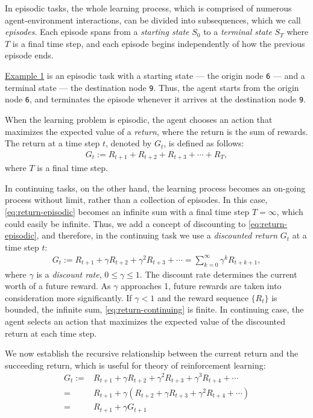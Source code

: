 In episodic tasks, the whole learning process, which is comprised of numerous agent-environment interactions, can be divided into subsequences, which we call \textit{episodes}. Each episode spans from a \textit{starting state} $S_0$ to a \textit{terminal state} $S_T$ where $T$ is a final time step, and each episode begins independently of how the previous episode ends. 

\hyperref[fig:toy graph]{Example 1} is an episodic task with a starting state --- the origin node \texttt{6} --- and a terminal state --- the destination node \texttt{9}. Thus, the agent starts from the origin node \texttt{6}, and terminates the episode whenever it arrives at the destination node \texttt{9}.

When the learning problem is episodic, the agent chooses an action that maximizes the expected value of a \textit{return}, where the return is the sum of rewards. The return at a time step $t$, denoted by $G_t$, is defined as follows:
\begin{align}
    \label{eq:return-episodic}
    G_t := R_{t+1} + R_{t+2} + R_{t+3} + \cdots + R_{T},
\end{align}
where $T$ is a final time step.

In continuing tasks, on the other hand, the learning process becomes an on-going process without limit, rather than a collection of episodes. In this case, \eqref{eq:return-episodic} becomes an infinite sum with a final time step $T = \infty$, which could easily be infinite. Thus, we add a concept of discounting to \eqref{eq:return-episodic}, and therefore, in the continuing task we use a \textit{discounted return} $G_t$ at a time step $t$:
\begin{align}
\label{eq:return-continuing}
    G_t := R_{t+1} + \gamma R_{t+2} + \gamma^2 R_{t+3} + \cdots = \sum_{k=0}^{\infty}\gamma^k R_{t+k+1},
\end{align}
where $\gamma$ is a \textit{discount rate}, $0\leq \gamma \leq 1$. The discount rate determines the current worth of a future reward. As $\gamma$ approaches 1, future rewards are taken into consideration more significantly. If $\gamma < 1$ and the reward sequence $\{R_t\}$ is bounded, the infinite sum, \eqref{eq:return-continuing} is finite. In continuing case, the agent selects an action that maximizes the expected value of the discounted return at each time step.

We now establish the recursive relationship between the current return and the succeeding return, which is useful for theory of reinforcement learning:
\begin{align}
\label{eq: rewards recursive}
    G_t :=& R_{t+1} + \gamma R_{t+2} + \gamma^2 R_{t+3} + \gamma^3 R_{t+4} + \cdots \nonumber\\
    =& R_{t+1} + \gamma\left(R_{t+2} + \gamma R_{t+3} + \gamma^2 R_{t+4} + \cdots \right) \nonumber\\
    =& R_{t+1} + \gamma G_{t+1}
\end{align}

